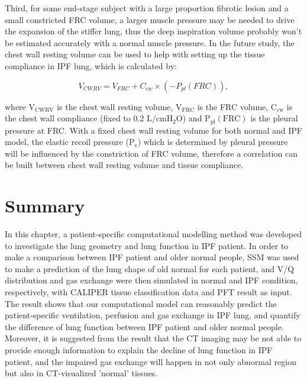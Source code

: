 Third, for some end-stage subject with a large proportion fibrotic lesion and a small constricted FRC volume, a larger muscle pressure may be needed to drive the expansion of the stiffer lung, thus the deep inspiration volume probably won't be estimated accurately with a normal muscle pressure. In the future study, the chest wall resting volume can be used to help with setting up the tissue compliance in IPF lung, which is calculated by:

\begin{equation} 
 \label{eq:ChestWallRestingVolume}
 V_{CWRV} = V_{FRC} + C_{cw} \times (-P_{pl}(FRC)),
\end{equation} 

\noindent where $\mathrm{V_{CWRV}}$ is the chest wall resting volume,  $\mathrm{V_{FRC}}$ is the FRC volume, $\mathrm{C_{cw}}$ is the chest wall compliance (fixed to 0.2 $\mathrm{L/cmH_2O}$) and $\mathrm{P_{pl}(FRC)}$ is the pleural pressure at FRC. With a fixed chest wall resting volume for both normal and IPF model, the elastic recoil pressure ($\mathrm{P_e}$) which is determined by pleural pressure will be influenced by the constriction of FRC volume, therefore a correlation can be built between chest wall resting volume and tissue compliance.

\section{Summary}
In this chapter, a patient-specific computational modelling method was developed to investigate the lung geometry and lung function in IPF patient. In order to make a comparison between IPF patient and older normal people, SSM was used to make a prediction of the lung shape of old normal for each patient, and V/Q distribution and gas exchange were then simulated in normal and IPF condition, respectively, with CALIPER tissue classification data and PFT result as input. The result shows that our computational model can reasonably predict the patient-specific ventilation, perfusion and gas exchange in IPF lung, and quantify the difference of lung function between IPF patient and older normal people. Moreover, it is suggested from the result that the CT imaging may be not able to provide enough information to explain the decline of lung function in IPF patient, and the impaired gas exchange will happen in not only abnormal region but also in CT-visualized 'normal' tissues.
